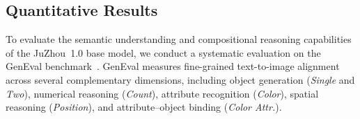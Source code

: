 \begin{table}[t]
    \centering
    \caption{Training configuration for each stage of the JuZhou 1.0 multi-stage training framework. All stages are conducted on the Sugon K100 AI cluster. (BS: Global Batch Size, LR: Learning Rate, Opt.: Optimizer)}
    \label{tab:training_config}
    \small
    \setlength{\tabcolsep}{5pt}
    \renewcommand{\arraystretch}{1.15}


    \renewcommand{\arraystretch}{1.0}
    \setlength{\tabcolsep}{6pt}
\end{table}

\subsection{Quantitative Results}

To evaluate the semantic understanding and compositional reasoning capabilities of the JuZhou~1.0 base model, we conduct a systematic evaluation on the GenEval benchmark~\cite{ghosh2023geneval}. GenEval measures fine-grained text-to-image alignment across several complementary dimensions, including object generation (\textit{Single} and \textit{Two}), numerical reasoning (\textit{Count}), attribute recognition (\textit{Color}), spatial reasoning (\textit{Position}), and attribute--object binding (\textit{Color Attr.}).

